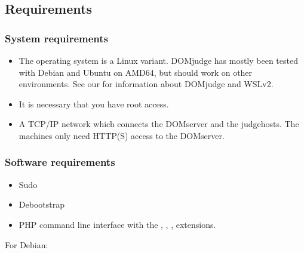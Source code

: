 \documentclass[a4paper,10pt,english,openany]{sphinxmanual}
\begin{document}
\subsection{Requirements}
\label{\detokenize{install-judgehost:requirements}}\label{\detokenize{install-judgehost:judgehost-requirements}}

\subsubsection{System requirements}
\label{\detokenize{install-judgehost:system-requirements}}\begin{itemize}
\item {} 
\sphinxAtStartPar
The operating system is a Linux variant. DOMjudge has mostly
been tested with Debian and Ubuntu on AMD64, but should work on other environments.
See our  for information about DOMjudge and WSLv2.

\item {} 
\sphinxAtStartPar
It is necessary that you have root access.

\item {} 
\sphinxAtStartPar
A TCP/IP network which connects the DOMserver and the judgehosts.
The machines only need HTTP(S) access to the DOMserver.

\end{itemize}


\subsubsection{Software requirements}
\label{\detokenize{install-judgehost:software-requirements}}\begin{itemize}
\item {} 
\sphinxAtStartPar
Sudo

\item {} 
\sphinxAtStartPar
Debootstrap

\item {} 
\sphinxAtStartPar
PHP command line interface with the , , ,
 extensions.

\end{itemize}

\sphinxAtStartPar
For Debian:

\begin{sphinxVerbatim}[commandchars=\\\{\}]
        \PYGZbs{}
            
\end{sphinxVerbatim}
\end{document}
